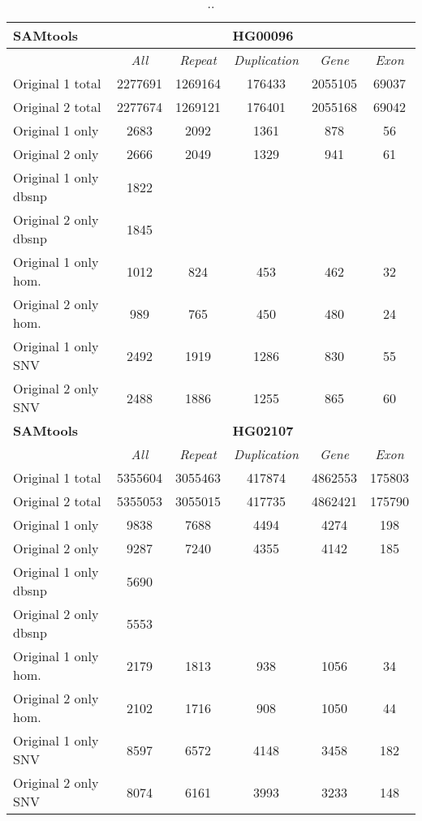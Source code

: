 \begin{table}[htb]
\begin{center}
\begin{tabular}{|l|c||c|c|c|c|}
\hline
{\bf SAMtools} & \multicolumn{5}{|c|}{\bf HG00096} \\
\hline
\cline{2-6}
{\bf} & {\it All} & {\it Repeat} & {\it Duplication} & {\it Gene} & {\it Exon} \\
\hline
Original 1 total & 2277691 & 1269164 & 176433 & 2055105 & 69037\\ 
\hline
Original 2 total & 2277674 & 1269121 & 176401 & 2055168 & 69042\\ 
\hline
Original 1 only & 2683 & 2092 & 1361 & 878 & 56\\ 
\hline
Original 2 only & 2666 & 2049 & 1329 & 941 & 61\\ 
\hline
Original 1 only dbsnp & 1822 &  &  &  & \\ 
\hline
Original 2 only dbsnp & 1845 &  &  &  & \\ 
\hline
Original 1 only hom. & 1012 & 824 & 453 & 462 & 32\\ 
\hline
Original 2 only hom. & 989 & 765 & 450 & 480 & 24\\ 
\hline
Original 1 only SNV & 2492 & 1919 & 1286 & 830 & 55\\ 
\hline
Original 2 only SNV & 2488 & 1886 & 1255 & 865 & 60\\ 
\hline
\hline
{\bf SAMtools} & \multicolumn{5}{|c|}{\bf HG02107} \\
\hline
\cline{2-6}
{\bf} & {\it All} & {\it Repeat} & {\it Duplication} & {\it Gene} & {\it Exon} \\
\hline
Original 1 total & 5355604 & 3055463 & 417874 & 4862553 & 175803\\ 
\hline
Original 2 total & 5355053 & 3055015 & 417735 & 4862421 & 175790\\ 
\hline
Original 1 only & 9838 & 7688 & 4494 & 4274 & 198\\ 
\hline
Original 2 only & 9287 & 7240 & 4355 & 4142 & 185\\ 
\hline
Original 1 only dbsnp & 5690 &  &  &  & \\ 
\hline
Original 2 only dbsnp & 5553 &  &  &  & \\ 
\hline
Original 1 only hom. & 2179 & 1813 & 938 & 1056 & 34\\ 
\hline
Original 2 only hom. & 2102 & 1716 & 908 & 1050 & 44\\ 
\hline
Original 1 only SNV & 8597 & 6572 & 4148 & 3458 & 182\\ 
\hline
Original 2 only SNV & 8074 & 6161 & 3993 & 3233 & 148\\ 
\hline
\end{tabular}
\end{center}
\caption{ .. }
\label{tab:orig-vs-shuf-samtools}
\end{table}

